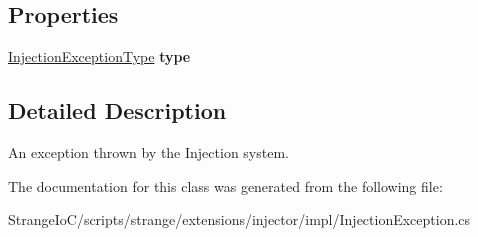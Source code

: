 \subsection*{Properties}
\begin{DoxyCompactItemize}
\item 
\hypertarget{classstrange_1_1extensions_1_1injector_1_1impl_1_1_injection_exception_a30971ecda24e1af5e691b05db615f91e}{\hyperlink{namespacestrange_1_1extensions_1_1injector_1_1api_a465caee64cba80e952ad7dd9a050e6c3}{Injection\-Exception\-Type} {\bfseries type}}\label{classstrange_1_1extensions_1_1injector_1_1impl_1_1_injection_exception_a30971ecda24e1af5e691b05db615f91e}

\end{DoxyCompactItemize}


\subsection{Detailed Description}
An exception thrown by the Injection system. 

The documentation for this class was generated from the following file\-:\begin{DoxyCompactItemize}
\item 
Strange\-Io\-C/scripts/strange/extensions/injector/impl/Injection\-Exception.\-cs\end{DoxyCompactItemize}
